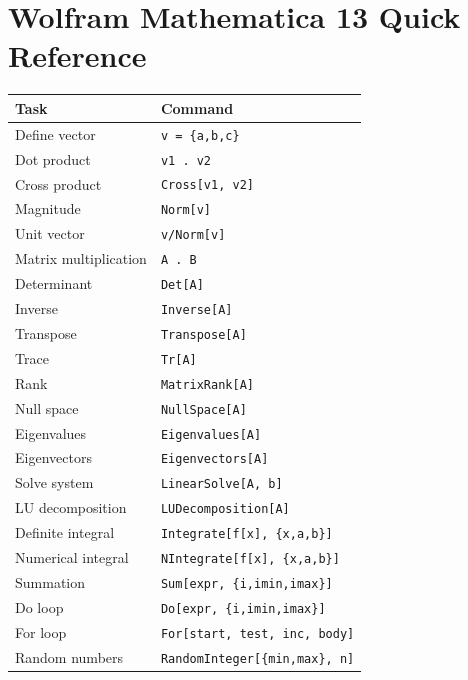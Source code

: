 \documentclass[12pt,a4paper]{article}
\begin{document}
\section{Wolfram Mathematica 13 Quick Reference}

\begin{center}
    \begin{tabular}{|l|l|}
        \hline
        \textbf{Task} & \textbf{Command} \\
        \hline
        Define vector & \texttt{v = \{a,b,c\}} \\
        Dot product & \texttt{v1 . v2} \\
        Cross product & \texttt{Cross[v1, v2]} \\
        Magnitude & \texttt{Norm[v]} \\
        Unit vector & \texttt{v/Norm[v]} \\
        Matrix multiplication & \texttt{A . B} \\
        Determinant & \texttt{Det[A]} \\
        Inverse & \texttt{Inverse[A]} \\
        Transpose & \texttt{Transpose[A]} \\
        Trace & \texttt{Tr[A]} \\
        Rank & \texttt{MatrixRank[A]} \\
        Null space & \texttt{NullSpace[A]} \\
        Eigenvalues & \texttt{Eigenvalues[A]} \\
        Eigenvectors & \texttt{Eigenvectors[A]} \\
        Solve system & \texttt{LinearSolve[A, b]} \\
        LU decomposition & \texttt{LUDecomposition[A]} \\
        Definite integral & \texttt{Integrate[f[x], \{x,a,b\}]} \\
        Numerical integral & \texttt{NIntegrate[f[x], \{x,a,b\}]} \\
        Summation & \texttt{Sum[expr, \{i,imin,imax\}]} \\
        Do loop & \texttt{Do[expr, \{i,imin,imax\}]} \\
        For loop & \texttt{For[start, test, inc, body]} \\
        Random numbers & \texttt{RandomInteger[\{min,max\}, n]} \\
        \hline
    \end{tabular}
\end{center}
\end{document}
